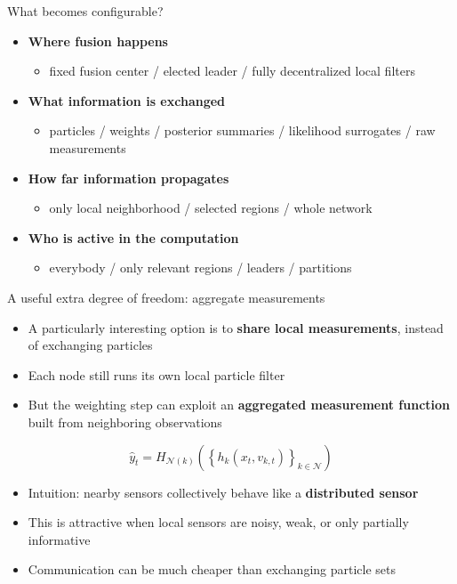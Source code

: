 \documentclass[aspectratio=169]{beamer}
\begin{document}
\begin{frame}{What becomes configurable?}
\begin{itemize}
    \item \textbf{Where fusion happens}
    \begin{itemize}
        \item fixed fusion center / elected leader / fully decentralized local filters
    \end{itemize}
    \item \textbf{What information is exchanged}
    \begin{itemize}
        \item particles / weights / posterior summaries / likelihood surrogates / raw measurements
    \end{itemize}
    \item \textbf{How far information propagates}
    \begin{itemize}
        \item only local neighborhood /  selected regions / whole network
    \end{itemize}
    \item \textbf{Who is active in the computation}
    \begin{itemize}
        \item everybody / only relevant regions / leaders / partitions
    \end{itemize}
\end{itemize}
\end{frame}

\begin{frame}{A useful extra degree of freedom: aggregate measurements}
\begin{itemize}
    \item A particularly interesting option is to \textbf{share local measurements}, instead of exchanging particles
    \item Each node still runs its own local particle filter
    \item But the weighting step can exploit an \textbf{aggregated measurement function} built from neighboring observations
\end{itemize}

\vspace{0.4em}
\[
\hat{y}_t = H_{\mathcal{N}(k)}\!\left(\left\{ h_k(x_t, v_{k,t}) \right\}_{k \in \mathcal{N}} \right)
\]

\begin{itemize}
    \item Intuition: nearby sensors collectively behave like a \textbf{distributed sensor}
    \item This is attractive when local sensors are noisy, weak, or only partially informative
    \item Communication can be much cheaper than exchanging particle sets
\end{itemize}
\end{frame}
\end{document}

